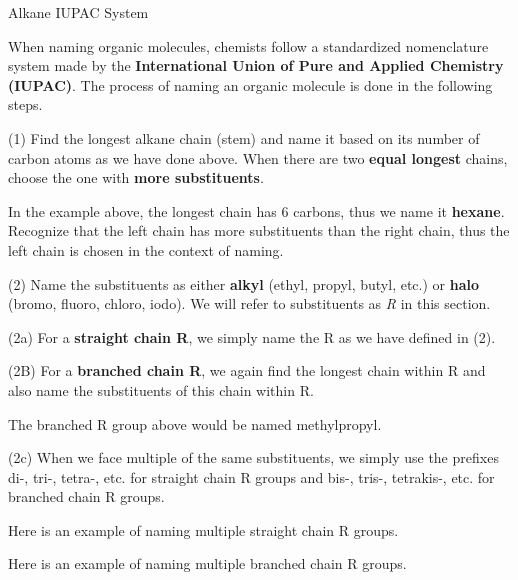 \documentclass[10pt]{article}
\begin{document}
    \begin{core}{Alkane IUPAC System}

      When naming organic molecules, chemists follow a standardized nomenclature system made by the \textbf{International Union of Pure and Applied Chemistry (IUPAC)}. The process of naming an organic molecule is done in the following steps.

      (1) Find the longest alkane chain (stem) and name it based on its number of carbon atoms as we have done above. When there are two \textbf{equal longest} chains, choose the one with \textbf{more substituents}.


      In the example above, the longest chain has 6 carbons, thus we name it \textbf{hexane}. Recognize that the left chain has more substituents than the right chain, thus the left chain is chosen in the context of naming.

      (2) Name the substituents as either \textbf{alkyl} (ethyl, propyl, butyl, etc.) or \textbf{halo} (bromo, fluoro, chloro, iodo). We will refer to substituents as \textit{R} in this section.

      (2a) For a \textbf{straight chain R}, we simply name the R as we have defined in (2).


      (2B) For a \textbf{branched chain R}, we again find the longest chain within R and also name the substituents of this chain within R. 


      The branched R group above would be named methylpropyl.

      (2c) When we face multiple of the same substituents, we simply use the prefixes di-, tri-, tetra-, etc. for straight chain R groups and bis-, tris-, tetrakis-, etc. for branched chain R groups.

      Here is an example of naming multiple straight chain R groups.
      
      
      Here is an example of naming multiple branched chain R groups.



\end{core}
\end{document}
